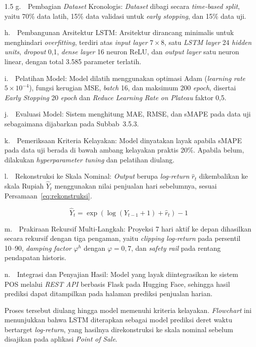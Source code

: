 \documentclass[12pt, a4paper, onecolumn, oneside]{report}
\begin{document}
\begin{spacing}{1.5}
\noindent g.~~Pembagian \textit{Dataset} Kronologis: \textit{Dataset} dibagi secara \textit{time-based split}, yaitu 70\% data latih, 15\% data validasi untuk \textit{early stopping}, dan 15\% data uji.

\noindent h.~~Pembangunan Arsitektur LSTM: Arsitektur dirancang minimalis untuk menghindari \textit{overfitting}, terdiri atas \textit{input layer} $7 \times 8$, satu \textit{LSTM layer} 24 \textit{hidden units}, \textit{dropout} 0,1, \textit{dense layer} 16 neuron ReLU, dan \textit{output layer} satu neuron linear, dengan total 3.585 parameter terlatih.

\noindent i.~~Pelatihan Model: Model dilatih menggunakan optimasi Adam (\textit{learning rate} $5 \times 10^{-4}$), fungsi kerugian MSE, \textit{batch} 16, dan maksimum 200 \textit{epoch}, disertai \textit{Early Stopping} 20 \textit{epoch} dan \textit{Reduce Learning Rate on Plateau} faktor 0,5.

\noindent j.~~Evaluasi Model: Sistem menghitung MAE, RMSE, dan sMAPE pada data uji sebagaimana dijabarkan pada Subbab~3.5.3.

\noindent k.~~Pemeriksaan Kriteria Kelayakan: Model dinyatakan layak apabila sMAPE pada data uji berada di bawah ambang kelayakan praktis 20\%. Apabila belum, dilakukan \textit{hyperparameter tuning} dan pelatihan diulang.

\noindent l.~~Rekonstruksi ke Skala Nominal: \textit{Output} berupa \textit{log-return} $\hat{r}_t$ dikembalikan ke skala Rupiah $\hat{Y}_t$ menggunakan nilai penjualan hari sebelumnya, sesuai Persamaan~\ref{eq:rekonstruksi}.

\begin{equation}
    \hat{Y}_{t} = \exp\left(\log(Y_{t-1} + 1) + \hat{r}_{t}\right) - 1
    \label{eq:rekonstruksi}
\end{equation}

\noindent m.~~Prakiraan Rekursif Multi-Langkah: Proyeksi 7 hari aktif ke depan dihasilkan secara rekursif dengan tiga pengaman, yaitu \textit{clipping log-return} pada persentil 10--90, \textit{damping factor} $\varphi^h$ dengan $\varphi = 0{,}7$, dan \textit{safety rail} pada rentang pendapatan historis.

\noindent n.~~Integrasi dan Penyajian Hasil: Model yang layak diintegrasikan ke sistem POS melalui \textit{REST API} berbasis Flask pada Hugging Face, sehingga hasil prediksi dapat ditampilkan pada halaman prediksi penjualan harian.

Proses tersebut diulang hingga model memenuhi kriteria kelayakan. \textit{Flowchart} ini menunjukkan bahwa LSTM diterapkan sebagai model prediksi deret waktu bertarget \textit{log-return}, yang hasilnya direkonstruksi ke skala nominal sebelum disajikan pada aplikasi \textit{Point of Sale}.


\end{spacing}
\end{document}
